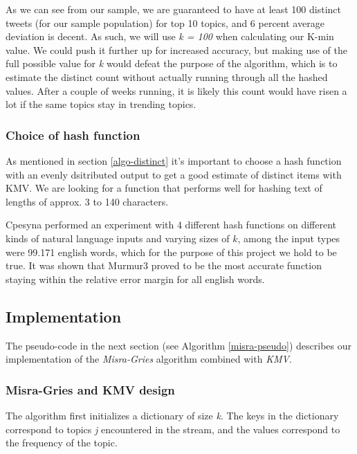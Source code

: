 As we can see from our sample, we are guaranteed to have at least 100 distinct tweets (for our sample population) for top 10 topics, and 6 percent average deviation is decent. As such, we will use \textit{k = 100} when calculating our K-min value. We could push it further up for increased accuracy, but making use of the full possible value for \textit{k} would defeat the purpose of the algorithm, which is to estimate the distinct count without actually running through all the hashed values. After a couple of weeks running, it is likely this count would have risen a lot if the same topics stay in trending topics.

\subsubsection{Choice of hash function}\label{hash-function}
As mentioned in section \ref{algo-distinct} it's important to choose a hash function with an evenly dsitributed output to get a good estimate of distinct items with KMV. We are looking for a function that performs well for hashing text of lengths of approx. 3 to 140 characters. 

Cpesyna \cite{KMV1} performed an experiment with 4 different hash functions on different kinds of natural language inputs and varying sizes of $k$, among the input types were 99.171 english words, which for the purpose of this project we hold to be true. It was shown that Murmur3 proved to be the most accurate function staying within the relative error margin for all english words.

\subsection{Implementation}\label{algo-data}
The pseudo-code in the next section (see Algorithm \ref{misra-pseudo}) describes our implementation of the \textit{Misra-Gries} algorithm combined with \textit{KMV}.  

\subsubsection{Misra-Gries and KMV design}\label{misra-gries}
The algorithm first initializes a dictionary of size \textit{k}. The keys in the dictionary correspond to topics \textit{j} encountered in the stream, and the values correspond to the frequency  of the topic. 

